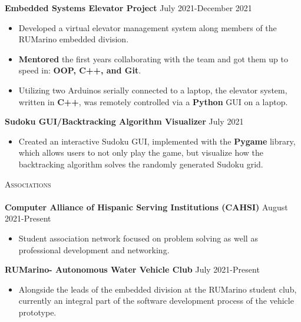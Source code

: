 \documentclass[a4paper]{article}
\newcommand{\lineunder} {
    \vspace*{-8pt} \\
    \hspace*{-18pt} \hrulefill \\
}
\newcommand{\header} [1] {
    {\hspace*{-18pt}\vspace*{6pt} \textsc{#1}}
    \vspace*{-6pt} \lineunder
}
\begin{document}
{\textbf{Embedded Systems Elevator Project}} \hfill \hfill July 2021-December 2021\\
\vspace{-1mm}

\begin{itemize} \itemsep -1pt
\item Developed a virtual elevator management system along members of the RUMarino embedded division.

\item \textbf{Mentored} the first years collaborating with the team and got them up to speed in: \textbf{OOP, C++, and Git}.

\item Utilizing two Arduinos serially connected to a laptop, the elevator system, written in \textbf{C++}, was remotely controlled via a \textbf{Python} GUI on a laptop.\\
\end{itemize}
\vspace*{-0.5mm}

{\textbf{Sudoku GUI/Backtracking Algorithm Visualizer}} \hfill July 2021  \\
\vspace{-1.8mm}
\begin{itemize} \itemsep -1pt
\item Created an interactive Sudoku GUI, implemented with the \textbf{Pygame} library, which allows users to not only play the game, but visualize how the backtracking algorithm solves the randomly generated Sudoku grid.
\end{itemize}

\header{Associations}

\vspace{-1mm} \textbf{Computer Alliance of Hispanic Serving Institutions (CAHSI)} \hfill August 2021-Present\\
\begin{itemize} \itemsep -1pt
\vspace{-2mm}
\item Student association network focused on problem solving as well as professional development and networking. \\
\end{itemize}

\vspace{-2mm}
\textbf{RUMarino- Autonomous Water Vehicle Club} \hfill July 2021-Present \\ 
\vspace{-2mm}
\begin{itemize} \itemsep -1pt
\item Alongside the leads of the embedded division at the RUMarino student club, currently an integral part of the software development process of the vehicle prototype. \\ 
\end{itemize}
 


\ 
\end{document}
